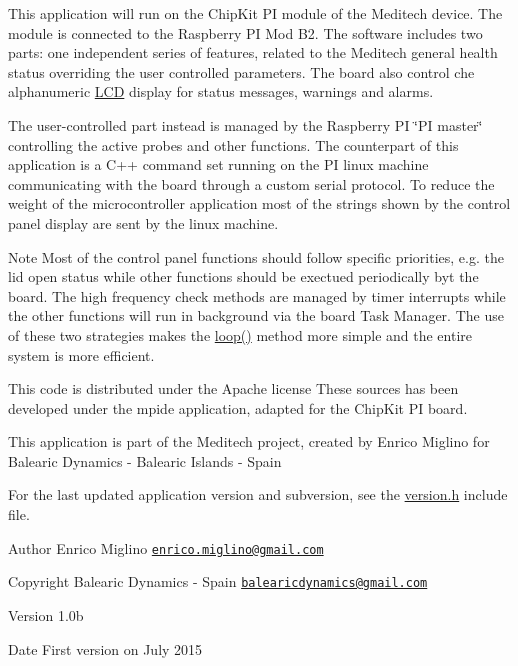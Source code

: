This application will run on the Chip\-Kit P\-I module of the Meditech device. The module is connected to the Raspberry P\-I Mod B2. The software includes two parts\-: one independent series of features, related to the Meditech general health status overriding the user controlled parameters. The board also control che alphanumeric \hyperlink{class_l_c_d}{L\-C\-D} display for status messages, warnings and alarms. \par
The user-\/controlled part instead is managed by the Raspberry P\-I \char`\"{}\-P\-I master\char`\"{} controlling the active probes and other functions. The counterpart of this application is a C++ command set running on the P\-I linux machine communicating with the board through a custom serial protocol. To reduce the weight of the microcontroller application most of the strings shown by the control panel display are sent by the linux machine.

\begin{DoxyNote}{Note}
Most of the control panel functions should follow specific priorities, e.\-g. the lid open status while other functions should be exectued periodically byt the board. The high frequency check methods are managed by timer interrupts while the other functions will run in background via the board Task Manager. The use of these two strategies makes the \hyperlink{_meditech___chip_kit_control_panel_8pde_a0b33edabd7f1c4e4a0bf32c67269be2f}{loop()} method more simple and the entire system is more efficient.
\end{DoxyNote}
This code is distributed under the Apache license These sources has been developed under the mpide application, adapted for the Chip\-Kit P\-I board.\par
This application is part of the Meditech project, created by Enrico Miglino for Balearic Dynamics -\/ Balearic Islands -\/ Spain\par
For the last updated application version and subversion, see the \hyperlink{_version_8h}{version.\-h} include file.

\begin{DoxyAuthor}{Author}
Enrico Miglino \href{mailto:enrico.miglino@gmail.com}{\tt enrico.\-miglino@gmail.\-com} 
\end{DoxyAuthor}
\begin{DoxyCopyright}{Copyright}
Balearic Dynamics -\/ Spain \href{mailto:balearicdynamics@gmail.com}{\tt balearicdynamics@gmail.\-com} 
\end{DoxyCopyright}
\begin{DoxyVersion}{Version}
1.\-0b 
\end{DoxyVersion}
\begin{DoxyDate}{Date}
First version on July 2015 
\end{DoxyDate}
